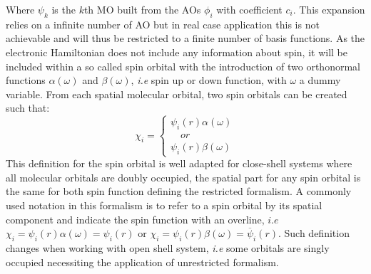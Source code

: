 \documentclass[12pt]{report}
\numberwithin{equation}{section}
\begin{document}
Where $\psi_k$ is the $k$th MO built from the AOs $\phi_i$ with coefficient $c_i$. 
This expansion relies on a infinite number of AO but in real case application this is not achievable and will thus be restricted to a finite number of basis functions.
As the electronic Hamiltonian does not include any information about spin, it will be included within a so called spin orbital with the introduction of two orthonormal functions $\alpha(\omega)$ and $\beta(\omega)$, \textit{i.e} spin up or down function, with $\omega$ a dummy variable.
From each spatial molecular orbital, two spin orbitals can be created such that:
\begin{equation}
    \chi_i=\begin{cases}
    \psi_i(r)\alpha(\omega)\\
    \quad or \\
    \psi_i(r)\beta(\omega)
    \end{cases}
\end{equation}
This definition for the spin orbital is well adapted for close-shell systems where all molecular orbitals are doubly occupied, the spatial part for any spin orbital is the same for both spin function defining the restricted formalism.
A commonly used notation in this formalism is to refer to a spin orbital by its spatial component and indicate the spin function with an overline, $i.e$ $\chi_i=\psi_i(r)\alpha(\omega)=\psi_i(r)$ or $\chi_i=\psi_i(r)\beta(\omega)=\overline{\psi}_i(r)$.
Such definition changes when working with open shell system, \textit{i.e} some orbitals are singly occupied necessiting the application of unrestricted formalism.
\end{document}
